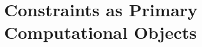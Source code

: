\documentclass[../../../clio.tex]{subfiles}
\begin{document}
\chapter{Constraints as Primary Computational Objects}
\label{ch:chapter-03-constraints-primary}





















\end{document}
